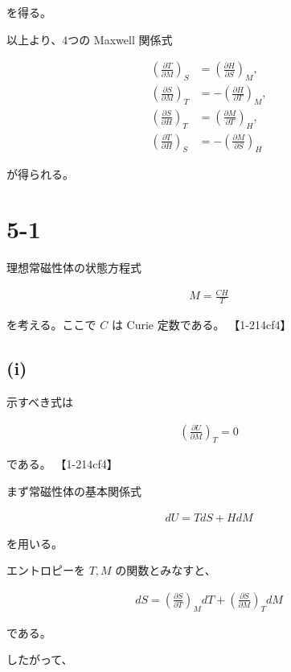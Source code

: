\documentclass[platex,dvipdfmx,a4paper]{jsarticle}
\begin{document}
を得る。

以上より、4つの Maxwell 関係式

\begin{align*}
\left(
\frac{\partial T}{\partial M}
\right)_S
&=
\left(
\frac{\partial H}{\partial S}
\right)_M,
\\
\left(
\frac{\partial S}{\partial M}
\right)_T
&=
-
\left(
\frac{\partial H}{\partial T}
\right)_M,
\\
\left(
\frac{\partial S}{\partial H}
\right)_T
&=
\left(
\frac{\partial M}{\partial T}
\right)_H,
\\
\left(
\frac{\partial T}{\partial H}
\right)_S
&=
-
\left(
\frac{\partial M}{\partial S}
\right)_H
\end{align*}

が得られる。
\section{5-1}

理想常磁性体の状態方程式

\begin{align*}
M=\frac{CH}{T}
\end{align*}

を考える。ここで $C$ は Curie 定数である。 【1-214cf4】

\subsection{(i)}

示すべき式は

\begin{align*}
\left(
\frac{\partial U}{\partial M}
\right)_T
=0
\end{align*}

である。 【1-214cf4】

まず常磁性体の基本関係式

\begin{align*}
dU
=
TdS+HdM
\end{align*}

を用いる。

エントロピーを $T,M$ の関数とみなすと、

\begin{align*}
dS
=
\left(
\frac{\partial S}{\partial T}
\right)_M dT
+
\left(
\frac{\partial S}{\partial M}
\right)_T dM
\end{align*}

である。

したがって、
\end{document}
